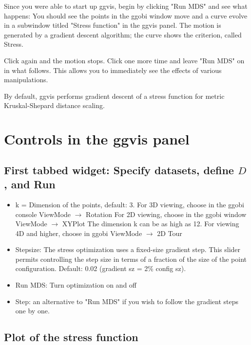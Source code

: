 \documentclass[11pt]{article}
\begin{document}
Since you were able to start up ggvis, begin by
clicking "Run MDS" and see what happens: You should see the points in
the ggobi window move and a curve evolve in a subwindow titled "Stress
function" in the ggvis panel.  The motion is generated by a gradient
descent algorithm; the curve shows the criterion, called Stress.

Click again and the motion stops.  Click one more time and leave "Run
MDS" on in what follows.  This allows you to immediately see the
effects of various manipulations.

By default, ggvis performs gradient descent of a stress function for
metric Kruskal-Shepard distance scaling.

\section{Controls in the ggvis panel}

\subsection{First tabbed widget: Specify datasets, define $D$, and Run}

\begin{itemize}
\item
k = Dimension of the points, default: 3.
    For 3D viewing, choose in the ggobi console ViewMode $\rightarrow$ Rotation
    For 2D viewing, choose in the ggobi window ViewMode $\rightarrow$ XYPlot
    The dimension k can be as high as 12.  
    For viewing 4D and higher, choose in ggobi ViewMode $\rightarrow$ 2D Tour
\item
Stepsize: The stress optimization uses a fixed-size gradient step.
    This slider permits controlling the step size in terms of a
    fraction of the size of the point configuration.  Default: 0.02
    (gradient sz = 2\% config sz).
\item
Run MDS: Turn optimization on and off
\item
Step: an alternative to "Run MDS" if you wish to follow the gradient
   steps one by one.
\end{itemize}

\subsection{Plot of the stress function}
\end{document}
